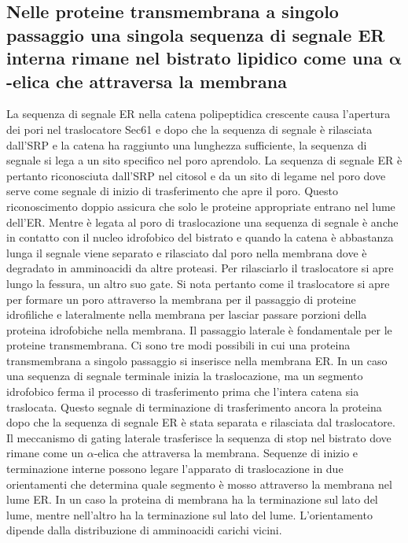 \subsection{Nelle proteine transmembrana a singolo passaggio una singola sequenza di segnale ER interna rimane nel bistrato lipidico come una $\mathbf{\alpha}$-elica che attraversa la 
membrana}
La sequenza di segnale ER nella catena polipeptidica crescente causa l'apertura dei pori nel traslocatore Sec61 e dopo che la sequenza di segnale \`e rilasciata dall'SRP e la catena
ha raggiunto una lunghezza sufficiente, la sequenza di segnale si lega a un sito specifico nel poro aprendolo. La sequenza di segnale ER \`e pertanto riconosciuta dall'SRP nel citosol
e da un sito di legame nel poro dove serve come segnale di inizio di trasferimento che apre il poro. Questo riconoscimento doppio assicura che solo le proteine appropriate entrano nel
lume dell'ER. Mentre \`e legata al poro di traslocazione una sequenza di segnale \`e anche in contatto con il nucleo idrofobico del bistrato e quando la catena \`e abbastanza lunga
il segnale viene separato e rilasciato dal poro nella membrana dove \`e degradato in amminoacidi da altre proteasi. Per rilasciarlo il traslocatore si apre lungo la 
fessura, un altro suo gate. Si nota pertanto come il traslocatore si apre per formare un poro attraverso la membrana per il passaggio di proteine idrofiliche e lateralmente nella 
membrana per lasciar passare porzioni della proteina idrofobiche nella membrana. Il passaggio laterale \`e fondamentale per le proteine transmembrana. Ci sono tre modi possibili in cui 
una proteina transmembrana a singolo passaggio si inserisce nella membrana ER. In un caso una sequenza di segnale  terminale inizia la traslocazione, ma un segmento idrofobico
ferma il processo di trasferimento prima che l'intera catena sia traslocata. Questo segnale di terminazione di trasferimento ancora la proteina dopo che la sequenza di segnale ER \`e
stata separata e rilasciata dal traslocatore. Il meccanismo di gating laterale trasferisce la sequenza di stop nel bistrato  dove rimane come un $\alpha$-elica che attraversa la 
membrana. Sequenze di inizio e terminazione interne possono legare l'apparato di traslocazione in due orientamenti che determina quale segmento \`e mosso attraverso la membrana nel 
lume ER. In un caso la proteina di membrana ha la terminazione  sul lato del lume, mentre nell'altro ha la terminazione  sul lato del lume. L'orientamento dipende dalla
distribuzione di amminoacidi carichi vicini.
